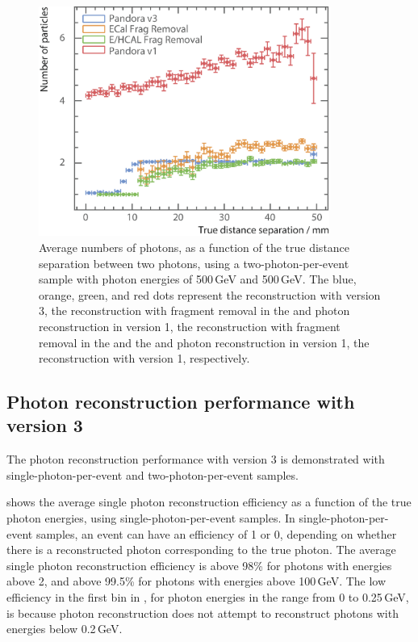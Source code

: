 \begin{figure}[tbph]
\centering
\includegraphics[width=0.85\textwidth]{photon/DoubleCompareAlg4}
\caption[Average number of photons, as a function of the MC distance separation for different algorithms combinations.]
{Average numbers of photons, as a function of the true distance separation between two photons, using a two-photon-per-event sample with photon energies of  500\,GeV and 500\,GeV. The blue, orange, green, and red dots represent the reconstruction with \pandora version 3, the reconstruction with fragment removal in the \ECAL and photon reconstruction in  \pandora version 1,  the reconstruction with fragment removal in the \ECAL and the \HCAL and photon reconstruction in  \pandora version 1, the reconstruction with \pandora version 1, respectively.}
\label{fig:photonDoubleCompareAlgs}
\end{figure}

\subsection{Photon reconstruction performance with \pandora version 3}

The photon reconstruction performance with \pandora version 3 is demonstrated with  single-photon-per-event and  two-photon-per-event samples.

 shows the average single photon reconstruction  efficiency as a function of the true photon energies, using single-photon-per-event samples.  In single-photon-per-event samples, an event can have an efficiency of 1 or 0, depending on whether there is a reconstructed photon  corresponding to the true photon. The average single photon reconstruction efficiency is above 98\% for photons with energies above 2\GeV, and above 99.5\% for photons  with energies  above 100\,GeV.  The low efficiency in the first bin in , for photon energies in the range from 0 to 0.25\,GeV, is because photon reconstruction does not attempt to reconstruct photons with energies below 0.2\,GeV.

